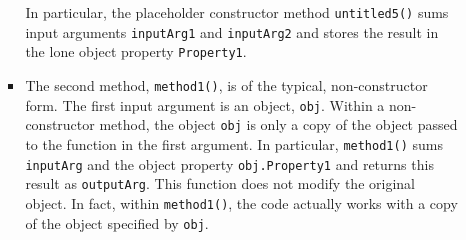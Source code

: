 \begin{enumerate}
\begin{itemize}
\begin{itemize}
In particular, the placeholder constructor method \texttt{untitled5()} sums input arguments \texttt{inputArg1} and \texttt{inputArg2} and stores the result in the lone object property \texttt{Property1}.

\item The second method, \texttt{method1()}, is of the typical, non-constructor form. The first input argument is an object, \texttt{obj}. %
Within a non-constructor method, the object \texttt{obj} is only a copy of the object passed to the function in the first argument. In particular, \texttt{method1()} sums \texttt{inputArg} and the object property \texttt{obj.Property1} and returns this result as \texttt{outputArg}. This function does not modify the original object. In fact, within \texttt{method1()}, the code actually works with a copy of the object specified by \texttt{obj}.%
\end{itemize}

\end{itemize}

\end{enumerate}

